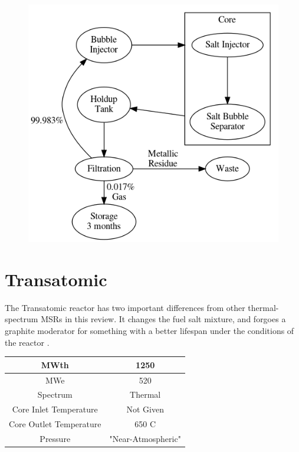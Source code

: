 \documentclass[letterpaper]{article}
\begin{document}
\begin{figure}[H]
  \centering
  \includegraphics[height=.5\textheight]{figures/msfr-offgas.png}
  \label{fig:figI}
\end{figure}

\section{Transatomic}

The Transatomic reactor has two important differences from other thermal-spectrum MSRs in this review.  It changes the fuel salt mixture, and forgoes a graphite moderator for something with a better lifespan under the conditions of the reactor \cite{robertson_assessment_2017}.

\begin{center}
\begin{tabular}{|c|c|}
\hline
MWth & 1250 \\
\hline
MWe & 520 \\
\hline
Spectrum & Thermal \\
\hline
Core Inlet Temperature & Not Given \\
\hline
Core Outlet Temperature & 650 C\\
\hline
Pressure & "Near-Atmospheric" \\
\hline
\end{tabular}
\end{center}
\end{document}
